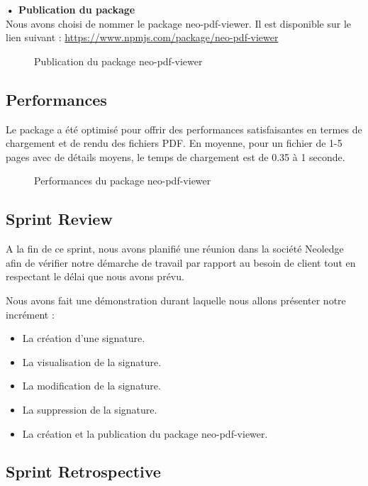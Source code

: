\textbf{•	Publication du package}\\
Nous avons choisi de nommer le package neo-pdf-viewer. Il est disponible sur le lien suivant : \url{https://www.npmjs.com/package/neo-pdf-viewer}

\begin{figure}
  \centering
  \caption{Publication du package neo-pdf-viewer}
  \label{fig:npm_package}
\end{figure}

\subsection{Performances}
Le package a été optimisé pour offrir des performances satisfaisantes en termes de chargement et de rendu des fichiers PDF.
En moyenne, pour un fichier de 1-5 pages avec de détails moyens, le temps de chargement est de 0.35 à 1 seconde.

\begin{figure}[H]
  \centering
  \caption{Performances du package neo-pdf-viewer}
  \label{fig:performance_package}
\end{figure}


\subsection{Sprint Review}
A la fin de ce sprint, nous avons planifié une réunion dans la société Neoledge afin de vérifier notre démarche de travail par rapport au besoin de client tout en respectant le délai que nous avons prévu.

Nous avons fait une démonstration durant laquelle nous allons présenter notre incrément :

\begin{itemize}
  \item La création d'une signature.
  \item La visualisation de la signature.
  \item La modification de la signature.
  \item La suppression de la signature.
  \item La création et la publication du package neo-pdf-viewer.
\end{itemize}

\subsection{Sprint Retrospective}

